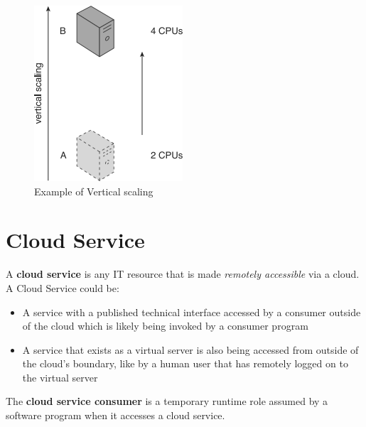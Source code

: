 \begin{itemize}
\begin{figure}[!h]
    \centering
    \includegraphics[width=.30\linewidth]{images/CloudComputing/VerticalScaling.png}
    \caption{Example of Vertical scaling}
\end{figure}
\end{itemize}


\section{Cloud Service}
A \textbf{cloud service} is any IT resource that is made \textit{remotely accessible} via a cloud. A Cloud Service could be:
\begin{itemize}
    \item A service with a published technical interface accessed by a consumer outside of the cloud which is likely being invoked by a consumer program
    \item A service that exists as a virtual server is also being accessed from outside of the cloud’s boundary, like by a human user that has remotely logged on to the virtual server
\end{itemize}
The \textbf{cloud service consumer} is a temporary runtime role assumed by a software program when it accesses a cloud service.

